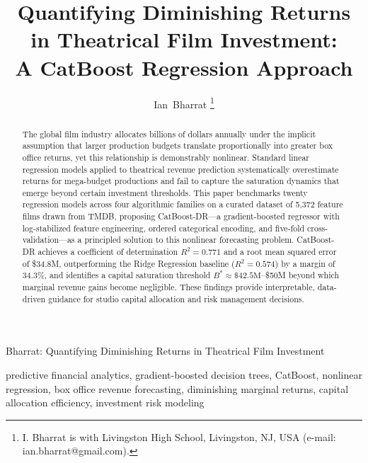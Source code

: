\documentclass[journal]{IEEEtran}
\begin{document}
\title{Quantifying Diminishing Returns in Theatrical Film Investment:\\A CatBoost Regression Approach}

\author{Ian~Bharrat%
\thanks{I. Bharrat is with Livingston High School, Livingston, NJ, USA (e-mail: ian.bharrat@gmail.com).}}

%
{Bharrat: Quantifying Diminishing Returns in Theatrical Film Investment}

\maketitle


\begin{abstract}
The global film industry allocates billions of dollars annually under the implicit assumption that larger production budgets translate proportionally into greater box office returns, yet this relationship is demonstrably nonlinear. Standard linear regression models applied to theatrical revenue prediction systematically overestimate returns for mega-budget productions and fail to capture the saturation dynamics that emerge beyond certain investment thresholds. This paper benchmarks twenty regression models across four algorithmic families on a curated dataset of 5,372 feature films drawn from TMDB, proposing CatBoost-DR—a gradient-boosted regressor with log-stabilized feature engineering, ordered categorical encoding, and five-fold cross-validation—as a principled solution to this nonlinear forecasting problem. CatBoost-DR achieves a coefficient of determination \(R^2 = 0.771\) and a root mean squared error of \$34.8M, outperforming the Ridge Regression baseline (\(R^2 = 0.574\)) by a margin of 34.3\%, and identifies a capital saturation threshold \(B^* \approx \$42.5\text{M}\)–\$50M beyond which marginal revenue gains become negligible. These findings provide interpretable, data-driven guidance for studio capital allocation and risk management decisions.
\end{abstract}

\begin{IEEEkeywords}
predictive financial analytics, gradient-boosted decision trees, CatBoost, nonlinear regression, box office revenue forecasting, diminishing marginal returns, capital allocation efficiency, investment risk modeling
\end{IEEEkeywords}
\end{document}
